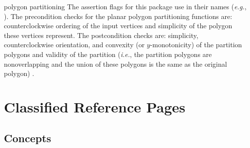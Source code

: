 
\begin{ccPackage}{polygon partitioning}
The assertion flags for this package use  in their names
({\em e.g.}, ).
The precondition checks for the planar polygon partitioning functions
are:  counterclockwise ordering of the input vertices and simplicity of the 
polygon these vertices represent.
The postcondition checks are:  simplicity, counterclockwise orientation,
and convexity (or $y$-monotonicity) of the partition polygons
and validity of the partition ({\em i.e.}, the partition polygons are 
nonoverlapping and the union of these polygons is the same as the
original polygon)
.
\end{ccPackage}

\section{Classified Reference Pages}

\subsection*{Concepts}


\lcHtml{







}

